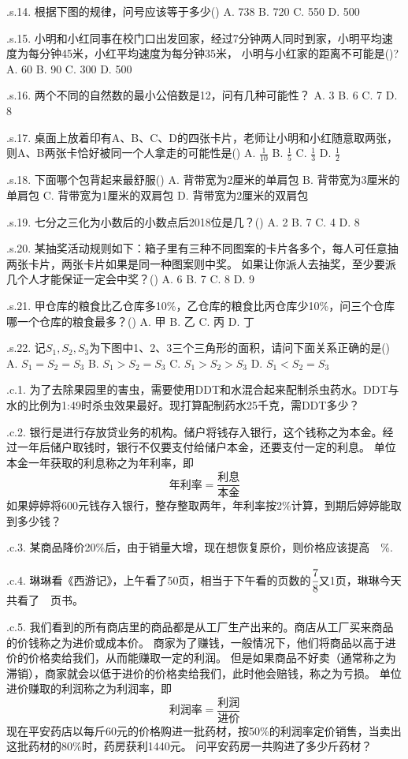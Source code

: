 .s.14. 根据下图的规律，问号应该等于多少(\quad)
A. 738
B. 720
C. 550
D. 500

.s.15. 小明和小红同事在校门口出发回家，经过7分钟两人同时到家，小明平均速度为每分钟45米，小红平均速度为每分钟35米，
小明与小红家的距离不可能是(\quad)?
A. 60
B. 90
C. 300
D. 500

.s.16. 两个不同的自然数的最小公倍数是12，问有几种可能性？
A. 3
B. 6
C. 7
D. 8

.s.17. 桌面上放着印有A、B、C、D的四张卡片，老师让小明和小红随意取两张，则A、B两张卡恰好被同一个人拿走的可能性是(\quad)
A. $\frac{1}{10}$
B. $\frac{1}{5}$
C. $\frac{1}{3}$
D. $\frac{1}{2}$

.s.18. 下面哪个包背起来最舒服(\quad)
A. 背带宽为2厘米的单肩包
B. 背带宽为3厘米的单肩包
C. 背带宽为1厘米的双肩包
D. 背带宽为2厘米的双肩包

.s.19. 七分之三化为小数后的小数点后2018位是几？(\quad)
A. 2
B. 7
C. 4
D. 8

.s.20. 某抽奖活动规则如下：箱子里有三种不同图案的卡片各多个，每人可任意抽两张卡片，两张卡片如果是同一种图案则中奖。
如果让你派人去抽奖，至少要派几个人才能保证一定会中奖？(\quad)
A. 6
B. 7
C. 8
D. 9

.s.21. 甲仓库的粮食比乙仓库多10\%，乙仓库的粮食比丙仓库少10\%，问三个仓库哪一个仓库的粮食最多？(\quad)
A. 甲
B. 乙
C. 丙
D. 丁

.s.22. 记$S_1, S_2, S_3$为下图中1、2、3三个三角形的面积，请问下面关系正确的是(\quad)
A. $S_1 = S_2 = S_3$
B. $S_1 > S_2 = S_3$
C. $S_1 > S_2 > S_3$
D. $S_1 < S_2 = S_3$


.c.1. 为了去除果园里的害虫，需要使用DDT和水混合起来配制杀虫药水。DDT与水的比例为1:49时杀虫效果最好。现打算配制药水25千克，需DDT多少？
\vspace{4cm}

.c.2. 银行是进行存放贷业务的机构。储户将钱存入银行，这个钱称之为本金。经过一年后储户取钱时，银行不仅要支付给储户本金，还要支付一定的利息。
单位本金一年获取的利息称之为年利率，即
\[
	\text{年利率} = \frac{\text{利息}}{\text{本金}}
\]
如果婷婷将600元钱存入银行，整存整取两年，年利率按2\%计算，到期后婷婷能取到多少钱？
\vspace{4cm}

.c.3. 某商品降价20\%后，由于销量大增，现在想恢复原价，则价格应该提高~\blank~\%.
\vspace{4cm}

.c.4. 琳琳看《西游记》，上午看了50页，相当于下午看的页数的$\cfrac{7}{8}$又1页，琳琳今天共看了~\blank~页书。
\vspace{4cm}

.c.5. 我们看到的所有商店里的商品都是从工厂生产出来的。商店从工厂买来商品的价钱称之为进价或成本价。
商家为了赚钱，一般情况下，他们将商品以高于进价的价格卖给我们，从而能赚取一定的利润。
但是如果商品不好卖（通常称之为滞销），商家就会以低于进价的价格卖给我们，此时他会赔钱，称之为亏损。
单位进价赚取的利润称之为利润率，即
\[
	\text{利润率} = \frac{\text{利润}}{\text{进价}}
\]
现在平安药店以每斤60元的价格购进一批药材，按50\%的利润率定价销售，当卖出这批药材的80\%时，药房获利1440元。
问平安药房一共购进了多少斤药材？
\vspace{4cm}

